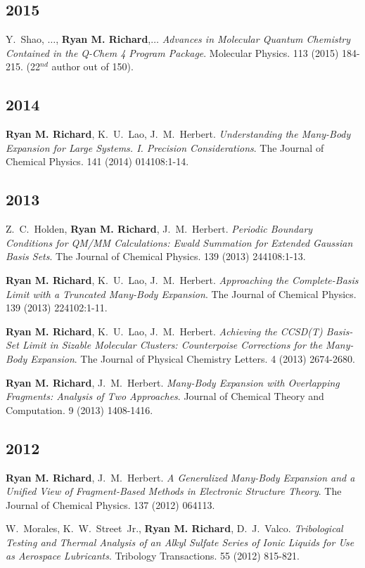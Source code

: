 \begin{etaremune}
	\subsection{2015}
	\item{Y.~Shao, $\ldots$, \textbf{Ryan M. Richard},$\ldots$  {\em Advances 
	      in Molecular Quantum Chemistry Contained in the Q-Chem 4 Program 
		  Package}.  Molecular Physics.  113 (2015) 184-215. (22$^{nd}$ author 
		  out of 150).}

	\subsection{2014}
	\item{\textbf{Ryan M. Richard}, K.~U.~Lao, J.~M.~Herbert.  
	      {\em Understanding the Many-Body Expansion for Large Systems.  
		  I. Precision Considerations}.  The Journal of Chemical Physics.  
		  141 (2014) 014108:1-14.}

	\subsection{2013}
	\item{Z.~C.~Holden, \textbf{Ryan M. Richard}, J.~M.~Herbert.  {\em Periodic 
	      Boundary Conditions for QM/MM Calculations: Ewald Summation for 
		  Extended Gaussian Basis Sets}.  The Journal of Chemical Physics.  
		  139 (2013) 244108:1-13.}
	\item{\textbf{Ryan M. Richard}, K.~U.~Lao, J.~M.~Herbert.  {\em Approaching
	      the Complete-Basis Limit with a Truncated Many-Body Expansion}.  The 
		  Journal of Chemical Physics.  139 (2013) 224102:1-11.}
	\item{\textbf{Ryan M. Richard}, K.~U.~Lao, J.~M.~Herbert.  {\em Achieving 
	      the CCSD(T) Basis-Set Limit in Sizable Molecular Clusters: 
		  Counterpoise Corrections for the Many-Body Expansion}.  The Journal of
		  Physical Chemistry Letters.  4 (2013) 2674-2680.}
	\item{\textbf{Ryan M. Richard}, J.~M.~Herbert. {\em Many-Body Expansion with
	      Overlapping Fragments: Analysis of Two Approaches}.  Journal of 
		  Chemical Theory and Computation.  9 (2013) 1408-1416.}

	\subsection{2012}
	\item{\textbf{Ryan M. Richard}, J.~M.~Herbert.  {\em A Generalized Many-Body
	      Expansion and a Unified View of Fragment-Based Methods in Electronic 
		  Structure Theory}. The Journal of Chemical Physics. 137 (2012) 
		  064113.}
	\item{W.~Morales, K.~W.~Street~Jr., \textbf{Ryan M. Richard}, D.~J.~Valco.  
	      {\em Tribological Testing and Thermal Analysis of an Alkyl Sulfate 
		  Series of Ionic Liquids for Use as Aerospace Lubricants}.  Tribology 
		  Transactions.  55 (2012) 815-821.}


\end{etaremune}
